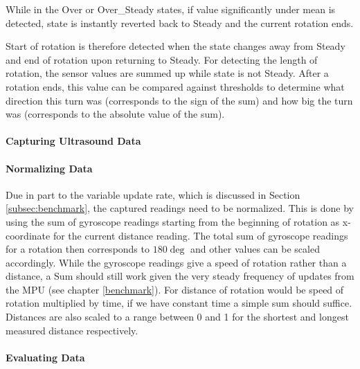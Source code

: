 While in the Over or Over_Steady states, if value significantly under mean is detected, state is instantly reverted back to Steady and the current rotation ends.

Start of rotation is therefore detected when the state changes away from Steady and end of rotation upon returning to Steady.
For detecting the length of rotation, the sensor values are summed up while state is not Steady.
After a rotation ends, this value can be compared against thresholds to determine what direction this turn was (corresponds to the sign of the sum) and how big the turn was (corresponds to the absolute value of the sum).


\paragraph{Capturing Ultrasound Data}

\paragraph{Normalizing Data}
Due in part to the variable update rate, which is discussed in Section \ref{subsec:benchmark}, the captured readings need to be normalized.
This is done by using the sum of gyroscope readings starting from the beginning of rotation as x-coordinate for the current distance reading.
The total sum of gyroscope readings for a rotation then corresponds to $180\deg$ and other values can be scaled accordingly.
While the gyroscope readings give a speed of rotation rather than a distance, a Sum should still work given the very steady frequency of updates from the MPU (see chapter \ref{benchmark}).
For distance of rotation would be speed of rotation multiplied by time, if we have constant time a simple sum should suffice.
Distances are also scaled to a range between 0 and 1 for the shortest and longest measured distance respectively.


\paragraph{Evaluating Data}